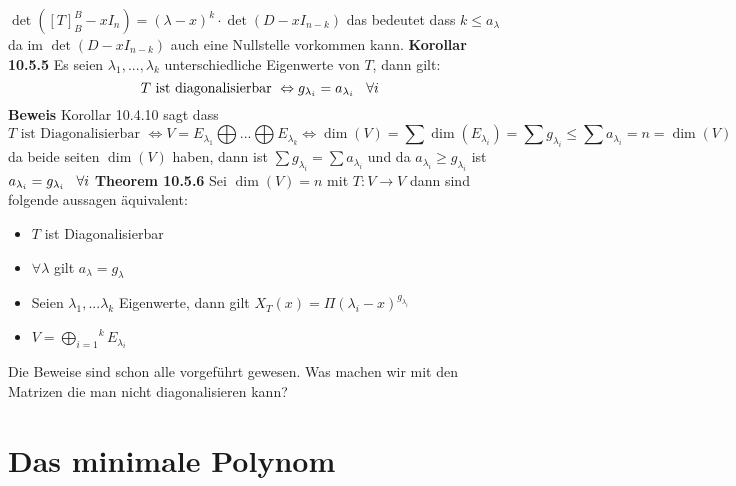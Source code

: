 \documentclass{article}
\newcommand{\smspc}{\hspace{0.3cm}}
\begin{document}
$\det([T]^B_B-xI_n)=(\lambda-x)^k\cdot\det(D-xI_{n-k})$ das bedeutet dass $k\le a_\lambda$ da im $\det(D-xI_{n-k})$ auch eine Nullstelle vorkommen kann.
\newline
\textbf{Korollar 10.5.5} Es seien $\lambda_1,...,\lambda_k$ unterschiedliche Eigenwerte von $T$, dann gilt: \[T \text{ ist diagonalisierbar }\Leftrightarrow g_{\lambda_i}=a_{\lambda_i}\smspc \forall i\]
\newline\textbf{Beweis} Korollar 10.4.10 sagt dass \[T\text{ ist Diagonalisierbar }\Leftrightarrow V=E_{\lambda_1}\bigoplus...\bigoplus E_{\lambda_k}\Leftrightarrow \dim(V)=\sum\dim(E_{\lambda_i})=\sum g_{\lambda_i}\le\sum a_{\lambda_i}=n=\dim(V)\]
da beide seiten $\dim(V)$ haben, dann ist $\sum g_{\lambda_i}=\sum a_{\lambda_i}$ und da $a_{\lambda_i}\ge g_{\lambda_i}$ ist $a_{\lambda_i}=g_{\lambda_i}\smspc\forall i$
\newline\textbf{Theorem 10.5.6} Sei $\dim(V)=n$ mit $T:V\rightarrow V$ dann sind folgende aussagen äquivalent:\begin{itemize}
  \item{$T$ ist Diagonalisierbar}
  \item{$\forall\lambda$ gilt $a_\lambda=g_\lambda$}
  \item{Seien $\lambda_1,...\lambda_k$ Eigenwerte, dann gilt $X_T(x)=\Pi(\lambda_i-x)^{g_{\lambda_i}}$}
  \item{$V=\overset{k}{\underset{i=1}{\bigoplus}}E_{\lambda_i}$}
\end{itemize}
Die Beweise sind schon alle vorgeführt gewesen.\newline
Was machen wir mit den Matrizen die man nicht diagonalisieren kann? 
\section{Das minimale Polynom}
\end{document}
